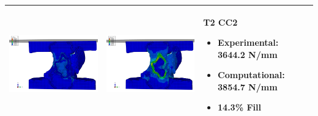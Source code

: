 \documentclass[11pt,a4paper]{article}
\begin{document}
\begin{landscape}
\begin{longtable}{|m{11cm}|m{11cm}|m{4cm}|}
\includegraphics[width=10cm]{images/T2_CC2_postVP_Interface_ABAQUS_All_Side_Stress.png}   & \includegraphics[width=10cm]{images/T2_CC2_postVP_Interface_ABAQUS_All_Side_Strain.png}   & T2 CC2  \begin{itemize} \item Experimental: 	3644.2	N/mm \item Computational:	3854.7 N/mm \item 14.3\% Fill \end{itemize} \\ \hline 

\end{longtable}
\end{landscape}
\end{document}
